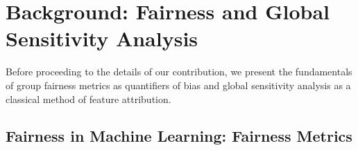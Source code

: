 \section{Background: Fairness and Global Sensitivity Analysis}\label{sec:preliminaries}%
Before proceeding to the details of our contribution, we present the fundamentals of group fairness metrics as quantifiers of bias and global sensitivity analysis as a classical method of feature attribution.%
\subsection{Fairness in Machine Learning: Fairness Metrics}

